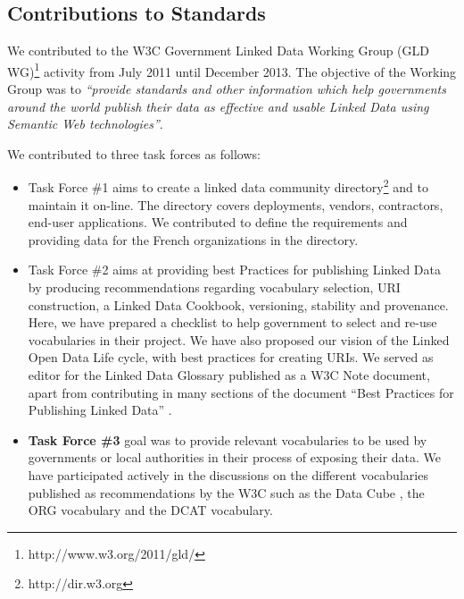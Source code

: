 \subsection{Contributions to Standards}
\label{sec:contrib-standard}
We contributed to the W3C Government Linked Data Working Group (GLD WG)\footnote{http://www.w3.org/2011/gld/} activity from July 2011 until December 2013.  The objective of the Working Group was to \textit{``provide standards and other information which help governments around the world publish their data as effective and usable Linked Data using Semantic Web technologies''}.

We contributed to three task forces as follows:
\begin{itemize}
\item Task Force \#1 aims to create a linked data community directory\footnote{http://dir.w3.org} and to maintain it on-line. The directory covers deployments, vendors, contractors, end-user applications. We contributed to define the requirements and providing data for the French organizations in the directory.

\item Task Force \#2 aims at providing best Practices for publishing Linked Data by producing recommendations regarding vocabulary selection, URI construction, a Linked Data Cookbook, versioning, stability and provenance. Here, we have prepared a checklist to help government to select and re-use vocabularies in their project. We have also proposed our vision of the Linked Open Data Life cycle, with best practices for creating URIs. We served as editor for the Linked Data Glossary \cite{glossairegld} published as a W3C Note document, apart from contributing in many sections of the document ``Best Practices for Publishing Linked Data'' \cite{bpgld}.

\item \textbf{Task Force \#3} goal was to provide relevant vocabularies to be used by governments or local authorities in their process of exposing their data. We have participated actively in the discussions on the different vocabularies published as recommendations by the W3C such as the Data Cube \cite{dcube}, the ORG vocabulary \cite{org} and the DCAT \cite{dcat} vocabulary.
\end{itemize}

